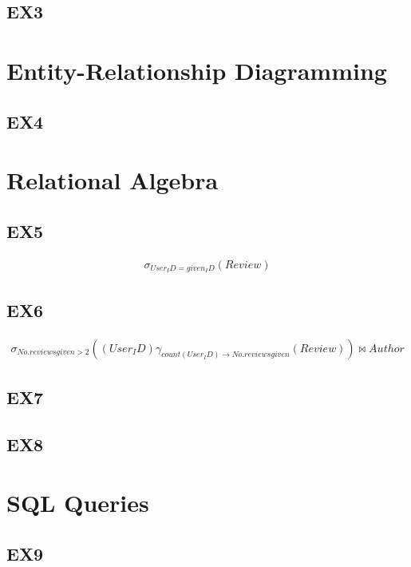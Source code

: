 \documentclass{article}
\begin{document}
	\subsection{EX3}
	
	\section{Entity-Relationship Diagramming}
	
	\subsection{EX4}
	
	\section{Relational Algebra}
	
	\subsection{EX5}
	\begin{eqnarray}
	\sigma_{User_ID = given_ID}(Review)
	\end{eqnarray}
		
	\subsection{EX6}
	\begin{eqnarray}
	\sigma _{No. reviews given > 2}((User_ID) \gamma _{count(User_ID) \rightarrow No. reviews given}(Review)) \bowtie Author
	\end{eqnarray}
	
	\subsection{EX7}
	
	\subsection{EX8}
	
	\section{SQL Queries}
	
	\subsection{EX9}
	
\end{document}
